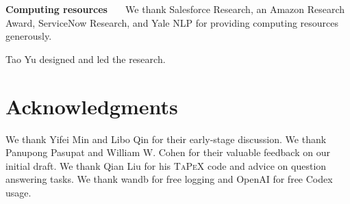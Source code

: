 \documentclass[11pt]{article}
\begin{document}
\noindent\textbf{Computing resources \ \ } We thank Salesforce Research, an Amazon Research Award, ServiceNow Research, and Yale NLP for providing computing resources generously. 

\noindent Tao Yu designed and led the research.  
\section*{Acknowledgments}
We thank Yifei Min and Libo Qin for their early-stage discussion. We thank Panupong Pasupat and William W. Cohen for their valuable feedback on our initial draft. We thank Qian Liu for his \textsc{TaPeX} code and advice on question answering tasks. 
We thank wandb for free logging and OpenAI for free Codex usage.  
\clearpage
\end{document}
